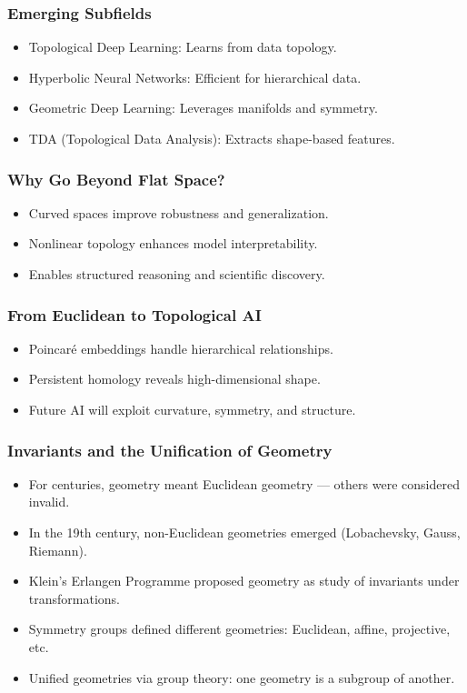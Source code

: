 \begin{frame}[fragile]\frametitle{Emerging Subfields}
  \begin{itemize}
    \item Topological Deep Learning: Learns from data topology.
    \item Hyperbolic Neural Networks: Efficient for hierarchical data.
    \item Geometric Deep Learning: Leverages manifolds and symmetry.
    \item TDA (Topological Data Analysis): Extracts shape-based features.
  \end{itemize}
\end{frame}

\begin{frame}[fragile]\frametitle{Why Go Beyond Flat Space?}
  \begin{itemize}
    \item Curved spaces improve robustness and generalization.
    \item Nonlinear topology enhances model interpretability.
    \item Enables structured reasoning and scientific discovery.
  \end{itemize}
\end{frame}

\begin{frame}[fragile]\frametitle{From Euclidean to Topological AI}
  \begin{itemize}
    \item Poincaré embeddings handle hierarchical relationships.
    \item Persistent homology reveals high-dimensional shape.
    \item Future AI will exploit curvature, symmetry, and structure.
  \end{itemize}
\end{frame}


\begin{frame}[fragile]\frametitle{Invariants and the Unification of Geometry}
  \begin{itemize}
    \item For centuries, geometry meant Euclidean geometry — others were considered invalid.
    \item In the 19th century, non-Euclidean geometries emerged (Lobachevsky, Gauss, Riemann).
    \item Klein’s Erlangen Programme proposed geometry as study of invariants under transformations.
    \item Symmetry groups defined different geometries: Euclidean, affine, projective, etc.
    \item Unified geometries via group theory: one geometry is a subgroup of another.
  \end{itemize}
\end{frame}

